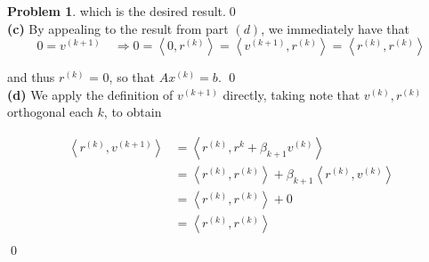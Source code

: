 \documentclass[10pt]{article}
\theoremstyle{plain}
\theoremstyle{definition}
\newtheorem{prob}{Problem}
\numberwithin{equation}{section}
\newcommand\ip[2]{ \left\langle {#1} , {#2} \right\rangle }
\begin{document}
\begin{prob}
which is the desired result.\qed\\
\textbf{(c)}
By appealing to the result from part $(d)$, we immediately have that
\[
    0 = v^{(k+1)} \quad \Longrightarrow  
          0  = \ip{0}{r^{(k)}} =  \ip{v^{(k+1)}}{r^{(k)}} =
          \ip{r^{(k)}}{r^{(k)}} \tag{$\bigstar$}
\]

and thus $r^{(k)}$ = 0, so that $Ax^{(k)} = b$. \qed\\
\newpage
\textbf{(d)}
We apply the definition of $v^{(k+1)}$ directly, taking note that $v^{(k)},r^{(k)}$
orthogonal each $k$, to obtain

\begin{align*}
        \ip{r^{(k)}}{v^{(k+1)}} &= \ip{r^{(k)}}{r^{k} + \beta_{k+1} v^{(k)}} \\
        &= \ip{r^{(k)}}{r^{(k)}} + \beta_{k+1} \ip{r^{(k)}}{v^{(k)}} \\
        &= \ip{r^{(k)}}{r^{(k)}} + 0 \\
        &= \ip{r^{(k)}}{r^{(k)}} \\
    \end{align*}
    \qed
\end{prob}
\hrulefill

\end{document}
